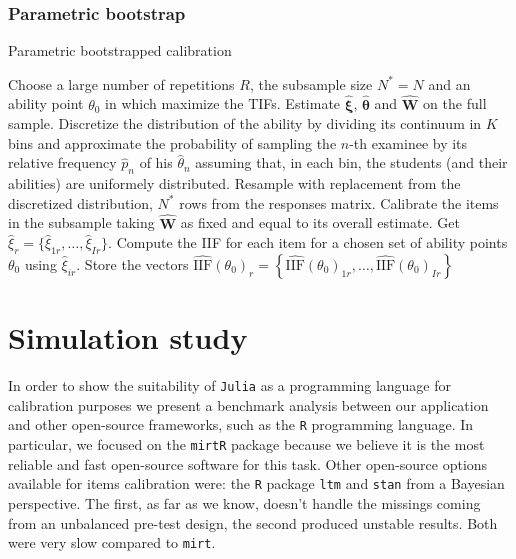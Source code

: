 \subsubsection{Parametric bootstrap}\label{sec:parbs}
\begin{algorithm}[h]
	\caption{Parametric bootstrapped calibration}
	\begin{algorithmic}
		\State Choose a large number of repetitions $R$, the subsample size $N^* = N$ and an ability point $\theta_0$ in which maximize the TIFs.
		\State Estimate $\boldsymbol{\hat{\xi}}$, $\hat{\boldsymbol{\theta}}$ and $\mathbf{\hat{W}}$ on the full sample.
		\State Discretize the distribution of the ability by dividing its continuum in $K$ bins and approximate the probability of sampling the $n$-th examinee by its relative frequency $\hat{p}_n$ of his $\hat{\theta}_n$ assuming that, in each bin, the students (and their abilities) are uniformely distributed.
	\State Resample with replacement from the discretized distribution, $N^*$ rows from the responses matrix.  
		\State Calibrate the items in the subsample taking $\mathbf{\hat{W}}$ as fixed and equal to its overall estimate. Get $\hat{\xi}_{r}=\{\hat{\xi}_{1r},\ldots,\hat{\xi}_{Ir}\}$.
		\State Compute the IIF for each item for a chosen set of ability points $\mathbb{\theta}_0$ using $\hat{\xi}_{ir}$.
		\State Store the vectors $\hat{\text{IIF}}(\theta_0)_{r}=\left\{\hat{\text{IIF}}(\theta_0)_{1r},\ldots,\hat{\text{IIF}}(\theta_0)_{Ir} \right\}$
		\EndFor
	\end{algorithmic}
\end{algorithm}

\section{Simulation study}

In order to show the suitability of \texttt{Julia} as a programming language for calibration purposes we present a benchmark analysis between our application and other open-source frameworks, such as the \texttt{R} programming language.
In particular, we focused on the \texttt{mirt}\texttt{R} package \parencite{R,JSSv048i06} because we believe it is the most reliable and fast open-source software for this task. 
Other open-source options available for items calibration were: the \texttt{R} package \texttt{ltm} \parencite{JSSv017i05} and \texttt{stan} \parencite{JSSv076i01} from a Bayesian perspective. The first, as far as we know, doesn't handle the missings coming from an unbalanced pre-test design, the second produced unstable results. Both were very slow compared to \texttt{mirt}.

